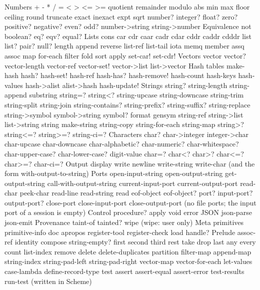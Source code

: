 \begin{txt}
Numbers      + - * / = < > <= >= quotient remainder modulo abs min max
             floor ceiling round truncate exact inexact expt sqrt
             number? integer? float? zero? positive? negative? even? odd?
             number->string string->number
Equivalence  not boolean? eq? eqv? equal?
Lists        cons car cdr caar cadr cdar cddr caddr cdddr list list? pair?
             null? length append reverse list-ref list-tail iota memq member
             assq assoc map for-each filter fold sort apply set-car! set-cdr!
Vectors      vector vector? vector-length vector-ref vector-set!
             vector->list list->vector
Hash tables  make-hash hash? hash-set! hash-ref hash-has? hash-remove!
             hash-count hash-keys hash-values hash->alist alist->hash
             hash-update!
Strings      string? string-length string-append substring string=? string<?
             string-upcase string-downcase string-trim string-split string-join
             string-contains? string-prefix? string-suffix? string-replace
             string->symbol symbol->string symbol? format gensym string-ref
             string->list list->string string make-string string-copy
             string-for-each string-map string>? string<=? string>=?
             string-ci=?
Characters   char? char->integer integer->char char-upcase char-downcase
             char-alphabetic? char-numeric? char-whitespace? char-upper-case?
             char-lower-case? digit-value char=? char<? char>? char<=? char>=?
             char-ci=?
Output       display write newline write-string write-char
                                            (and the form with-output-to-string)
Ports        open-input-string open-output-string get-output-string
             call-with-output-string current-input-port current-output-port
             read-char peek-char read-line read-string read eof-object
             eof-object? port? input-port? output-port? close-port
             close-input-port close-output-port   (no file ports; the input
                                            port of a session is empty)
Control      procedure? apply void error
JSON         json-parse json-emit
Provenance   taint-of tainted? wipe        (wipe: user only)
Meta         primitives primitive-info doc apropos register-tool register-check
             load handle?
Prelude      assoc-ref identity compose string-empty? first second third
             rest take drop last any every count list-index remove delete
             delete-duplicates partition filter-map append-map string-index
             string-pad-left string-pad-right vector-map vector-for-each
             let-values case-lambda define-record-type test assert
             assert-equal assert-error test-results run-test
                                                          (written in Scheme)
\end{txt}

